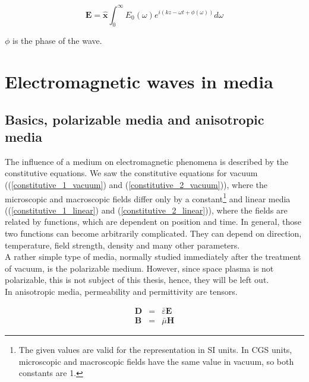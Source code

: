 \documentclass[a4paper,14pt]{extbook}
\begin{document}
\begin{equation}\label{superpos_of_waves}
    \mathbf{E}= \mathbf{\hat{x}} \int_0^\infty E_0(\omega ) e^{i(kz-\omega t + \phi(\omega)) }d\omega
\end{equation}

$\phi$ is the phase of the wave.

\section{Electromagnetic waves in media}
\subsection{Basics, polarizable media and anisotropic media}
The influence of a medium on electromagnetic phenomena is described by the constitutive equations. We saw the constitutive equations for vacuum ((\ref{constitutive_1_vacuum}) and (\ref{constitutive_2_vacuum})), where the microscopic and macroscopic fields differ only by a constant\footnote{The given values are valid for the representation in SI units. In CGS units, microscopic and macroscopic fields have the same value in vacuum, so both constants are 1.} and linear media ((\ref{constitutive_1_linear}) and (\ref{constitutive_2_linear})), where the fields are related by functions, which are dependent on position and time. In general, those two functions can become arbitrarily complicated. They can depend on direction, temperature, field strength, density and many other parameters.\\

A rather simple type of media, normally studied immediately after the treatment of vacuum, is the polarizable medium. However, since space plasma is not polarizable, this is not subject of this thesis, hence, they will be left out.\\

In anisotropic media, permeability and permittivity are tensors.

\begin{eqnarray}
\mathbf{D} &=& \bar{\varepsilon}  \mathbf{E} \label{constitutive_1_unisotrop} \\
\mathbf{B} &=& \bar{\mu} \mathbf{H} \label{constitutive_2_unisotrop}
\end{eqnarray}
\end{document}
